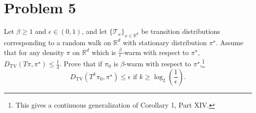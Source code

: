\section*{Problem 5}

Let $\beta \geq 1$ and $\epsilon \in (0,1)$, and let $\{\mathcal{T}_x\}_{x \in \mathbb{R}^d}$ be transition distributions corresponding to a random walk on $\mathbb{R}^d$ with stationary distribution $\pi^\star$. Assume that for any density $\pi$ on $\mathbb{R}^d$ which is $\frac{\beta}{\epsilon}$-warm with respect to $\pi^\star$, $D_{\mathrm{TV}}(T\pi, \pi^\star) \leq \frac{1}{4}$. Prove that if $\pi_0$ is $\beta$-warm with respect to $\pi^\star$,\footnote{This gives a continuous generalization of Corollary 1, Part XIV.}
\[
D_{\mathrm{TV}}\left(T^k \pi_0, \pi^\star\right) \leq \epsilon \text{ if } k \geq \log_2\left(\frac{1}{\epsilon}\right).
\]
